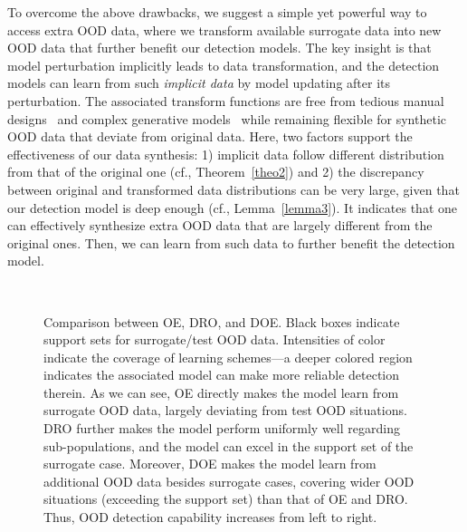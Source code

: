 \documentclass{article} \usepackage{iclr2022_conference,times}
\begin{document}
To overcome the above drawbacks, we suggest a simple yet powerful way to access extra OOD data, where we transform available surrogate data into new OOD data that further benefit our detection models. The key insight is that model perturbation implicitly leads to data transformation, and the detection models can learn from such \emph{implicit data} by model updating after its perturbation. The associated transform functions are free from tedious manual designs~\citep{zhang2021mixture,huang2023harnessing} and complex generative models~\citep{lee2017training} while remaining flexible for synthetic OOD data that deviate from original data. Here, two factors support the effectiveness of our data synthesis: 1) implicit data follow different distribution from that of the original one (cf., Theorem~\ref{theo2}) and 2) the discrepancy between original and transformed data distributions can be very large, given that our detection model is deep enough (cf., Lemma~\ref{lemma3}). It indicates that one can effectively synthesize extra OOD data that are largely different from the original ones. Then, we can learn from such data to further benefit the detection model.

\begin{figure*}[t]
    \centering
    ~~~~~~~~~~~~
    ~~~~~~~~~~~~
    \caption{
    Comparison between OE, DRO, and DOE. Black boxes indicate support sets for surrogate/test OOD data. Intensities of color indicate the coverage of learning schemes---a deeper colored region indicates the associated model can make more reliable detection therein. As we can see, OE directly makes the model learn from surrogate OOD data, largely deviating from test OOD situations. DRO further makes the model perform uniformly well regarding sub-populations, and the model can excel in the support set of the surrogate case. Moreover, DOE makes the model learn from additional OOD data besides surrogate cases, covering wider OOD situations (exceeding the support set) than that of OE and DRO. Thus, OOD detection capability increases from left to right. 
}
    \vspace{-15pt}
    \label{fig:mot}
\end{figure*}
\end{document}
